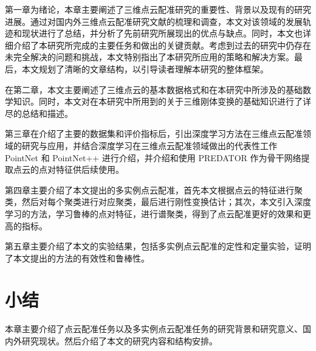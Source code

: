 第一章为绪论，本章主要阐述了三维点云配准研究的重要性、背景以及现有的研究进展。通过对国内外三维点云配准研究文献的梳理和调查，本文对该领域的发展轨迹和现状进行了总结，并分析了先前研究所展现出的优点与缺点。同时，本文也详细介绍了本研究所完成的主要任务和做出的关键贡献。考虑到过去的研究中仍存在未完全解决的问题和挑战，本文特别指出了本研究所应用的策略和解决方案。最后，本文规划了清晰的文章结构，以引导读者理解本研究的整体框架。

在第二章，本文主要阐述了三维点云的基本数据格式和在本研究中所涉及的基础数学知识。同时，本文对在本研究中所用到的关于三维刚体变换的基础知识进行了详尽的总结和描述。

第三章在介绍了主要的数据集和评价指标后，引出深度学习方法在三维点云配准领域的研究与应用，并结合深度学习在三维点云配准领域做出的代表性工作 PointNet \cite{qi2017pointnet} 和 PointNet++ \cite{qi2017pointnet++} 进行介绍，并介绍和使用 PREDATOR \cite{huang2021predator} 作为骨干网络提取点云的点对特征供后续使用。

第四章主要介绍了本文提出的多实例点云配准，首先本文根据点云的特征进行聚类，然后对每个聚类进行对应聚类，最后进行刚性变换估计；其次，本文引入深度学习的方法，学习鲁棒的点对特征，进行谱聚类，得到了点云配准更好的效果和更高的指标。

第五章主要介绍了本文的实验结果，包括多实例点云配准的定性和定量实验，证明了本文提出的方法的有效性和鲁棒性。
\section{小结}
本章主要介绍了点云配准任务以及多实例点云配准任务的研究背景和研究意义、国内外研究现状。然后介绍了本文的研究内容和结构安排。
